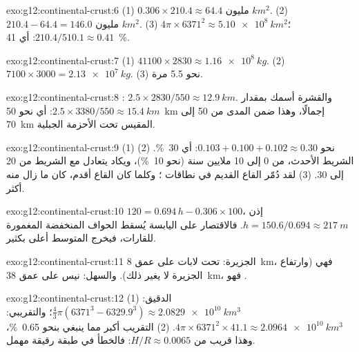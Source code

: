 \begin{solution}{exo:g12:continental-crust:6}
(1) $0.306 \times 210.4 \approx \num{64.4}\text{ مليون }\unit{km^2}$.
(2) $210.4 - 64.4 = \num{146.0}\text{ مليون }\unit{km^2}$.
(3) $4\pi \times 6371^2 \approx \qty{5.10e8}{km^2}$؛ $210.4/510.1 \approx
0.41$: أي \qty{41}{\percent}.
\end{solution}

\begin{solution}{exo:g12:continental-crust:7}
(1) $41100 \times 2830 \approx \qty{1.16e8}{kg}$. (2) $7100 \times 3000 =
\qty{2.13e7}{kg}$. (3) نحو 5.5 مرة.
\end{solution}

\begin{solution}{exo:g12:continental-crust:8}
: $2.5 \times 2830/550 \approx \qty{12.9}{km}$. والقشرة أسمك بمقدار
$2.5 \times 3380/550 \approx \qty{15.4}{km}$: أي نحو \qty{50}{km} إجمالًا،
وهذا ضمن المدى من 50 إلى \qty{70}{km} المقيس تحت الأحزمة الجبلية.
\end{solution}

\begin{solution}{exo:g12:continental-crust:9}
(1) نحو $0.103 + 0.100 + 0.102 \approx 0.30$: أي \qty{30}{\percent}.
(2) الشريط الأحدث، من 0 إلى 10 ملايين سنة (نحو \qty{10}{\percent})،
ويكاد يتعادل مع الشريط من 20 إلى 30. (3) لقد دُمّر القاع القديم في نطاقات
؛ وكلما كان القاع أقدم، كان ما زال منه أكثر.
\end{solution}

\begin{solution}{exo:g12:continental-crust:10}
$120 = 0.694\,h - 0.306 \times 100$، إذن $h = 150.6/0.694 \approx
\qty{217}{m}$. فالاقتصار على اليابسة يُسقط الحواف المنخفضة المغمورة
للقارات، فيخرج المتوسط أعلى بكثير.
\end{solution}

\begin{solution}{exo:g12:continental-crust:11}
الجزيرة:  تحت لابات  على عمق \qty{8}{km}، فهي 
(وارتفاع الجزيرة لا يغير ذلك). والسهل: نيس  على
عمق \qty{38}{km}، فهو .
\end{solution}

\begin{solution}{exo:g12:continental-crust:12}
(1) الدقيق: $\tfrac{4}{3}\pi(6371^3 - 6329.9^3) \approx
\qty{2.0829e10}{km^3}$؛ والتقريبي: $4\pi \times 6371^2 \times 41.1
\approx \qty{2.0964e10}{km^3}$. (2) التقريب أكبر مما ينبغي بنحو
\qty{0.65}{\percent}، وهذا قريب من $H/R \approx 0.0065$: فالخطأ في طبقة
رقيقة مهمل.
\end{solution}

